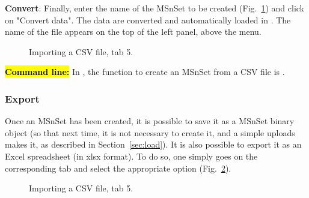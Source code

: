 \documentclass[12pt]{article}
\begin{document}
\textbf {Convert}: Finally, enter the name of the MSnSet to be created 
(Fig.~\ref{fig:imp5}) and click on "Convert data". The data are converted 
and automatically loaded in . The name of the file appears 
on the top of the left panel, above the menu.
\begin {figure}
\centering
{}
\caption{Importing a CSV file, tab 5.}\label{fig:imp5}
\end {figure}


\hl{\bf Command line:} In , the function to create an MSnSet 
from a CSV file is .


\subsubsection{Export}
Once an MSnSet has been created, it is possible to save it as a MSnSet binary 
object (so that next time, it is not necessary to create it, and a simple 
uploads makes it, as described in Section~\ref{sec:load}). It is also possible 
to export it as an Excel spreadsheet (in xlsx format). To do so, one simply goes on the 
corresponding tab and select the appropriate option (Fig.~\ref{fig:export}).


\begin {figure}
\centering
{}
\caption{Importing a CSV file, tab 5.}\label{fig:export}
\end {figure}
\end{document}
